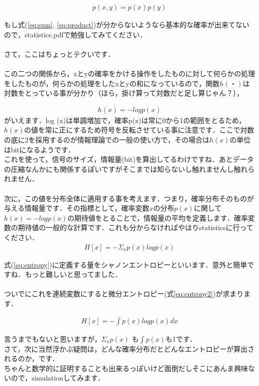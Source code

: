 \documentclass[11pt,a4paper,uplatex]{ujreport}
\begin{document}
\begin{eqnarray}
\label{eq:product}
p(x,y) = p(x)p(y)
\end{eqnarray}

もし式(\ref{eq:sum}, \ref{eq:product})が分からないようなら基本的な確率が出来てないので，statistics.pdfで勉強してみてください．\\
\\
さて，ここはちょっとテクいです．\\
\\
この二つの関係から，xとyの確率をかける操作をしたものに対して何らかの処理をしたものが，何らかの処理をしたxとyの和になっているので，関数$h(・)$は対数をとっている事が分かり（ほら，掛け算って対数だと足し算じゃん？），

\begin{eqnarray}
h(x) = -log p(x)
\end{eqnarray}
がいえます．log (x)は単調増加で，確率p(x)は常に0から1の範囲をとるため，$h(x)$の値を常に正にするため符号を反転させている事に注意です．ここで対数の底に2を採用するのが情報理論での一般の使い方で，その場合は$h(x)$の単位はbitになるようです．\\
これを使って，信号のサイズ，情報量(bit)を算出してるわけですね．あとデータの圧縮なんかにも関係するぽいですがそこまでは知らないし触れませんし触れられません．\\
\\
次に，この値を分布全体に適用する事を考えます．つまり，確率分布そのものが与える情報量です．その指標として，確率変数$x$の分布$p(x)$に関して$h(x)=-log p(x)$の期待値をとることで，情報量の平均を定義します．確率変数の期待値の一般的な計算です．これも分からなければやはりstatisticsに行ってください．\\

\begin{eqnarray}
\label{eq:entropy}
H[x] = - \Sigma_{x} p(x) log p(x)
\end{eqnarray}

式(\ref{eq:entropy})に定義する量をシャノンエントロピーといいます\cite{prml}．意外と簡単ですね．もっと難しいと思ってました．\\
\\
ついでにこれを連続変数にすると微分エントロピー(式\ref{eq:entropy2})が求まります．

\begin{eqnarray}
\label{eq:entropy2}
H[x] = - \int p(x) log p(x) dx
\end{eqnarray}

言うまでもないと思いますが，$ \Sigma_{x} p(x)$ も$ \int p(x)$も1です．\\
さて，次に当然浮かぶ疑問は，どんな確率分布だとどんなエントロピーが算出されるのか，です．\\
ちゃんと数学的に証明することも出来るっぽいけど面倒だしそこにあんま興味ないので，simulationしてみます．\\
\end{document}
